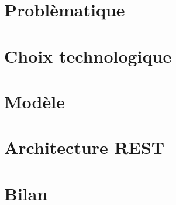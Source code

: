 \begin{frame}
 \tableofcontents
\end{frame}

\section{Problèmatique}


\section{Choix technologique}


\section{Modèle}


\section{Architecture REST}


\section{Bilan}

 
